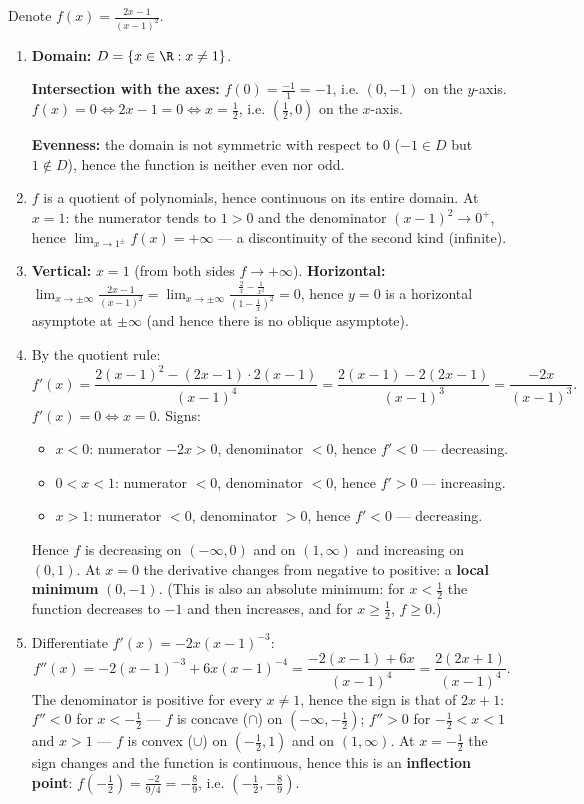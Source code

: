 \begin{solution}
Denote $f(x)=\frac{2x-1}{(x-1)^2}$.
\begin{enumerate}
  \item \textbf{Domain:} $D=\{x\in\R: x\neq1\}$.

  \textbf{Intersection with the axes:} $f(0)=\frac{-1}{1}=-1$, i.e. $(0,-1)$ on the $y$-axis. $f(x)=0\iff 2x-1=0\iff x=\frac12$, i.e. $(\frac12,0)$ on the $x$-axis.

  \textbf{Evenness:} the domain is not symmetric with respect to $0$ ($-1\in D$ but $1\notin D$), hence the function is neither even nor odd.

  \item $f$ is a quotient of polynomials, hence continuous on its entire domain. At $x=1$: the numerator tends to $1>0$ and the denominator $(x-1)^2\to0^+$, hence $\lim_{x\to1^\pm}f(x)=+\infty$ --- a discontinuity of the second kind (infinite).

  \item \textbf{Vertical:} $x=1$ (from both sides $f\to+\infty$).
  \textbf{Horizontal:} $\lim_{x\to\pm\infty}\frac{2x-1}{(x-1)^2}=\lim_{x\to\pm\infty}\frac{\frac2x-\frac1{x^2}}{(1-\frac1x)^2}=0$, hence $y=0$ is a horizontal asymptote at $\pm\infty$ (and hence there is no oblique asymptote).

  \item By the quotient rule:
  \[ f'(x)=\frac{2(x-1)^2-(2x-1)\cdot2(x-1)}{(x-1)^4}=\frac{2(x-1)-2(2x-1)}{(x-1)^3}=\frac{-2x}{(x-1)^3}. \]
  $f'(x)=0\iff x=0$. Signs:
  \begin{itemize}
    \item $x<0$: numerator $-2x>0$, denominator $<0$, hence $f'<0$ --- decreasing.
    \item $0<x<1$: numerator $<0$, denominator $<0$, hence $f'>0$ --- increasing.
    \item $x>1$: numerator $<0$, denominator $>0$, hence $f'<0$ --- decreasing.
  \end{itemize}
  Hence $f$ is decreasing on $(-\infty,0)$ and on $(1,\infty)$ and increasing on $(0,1)$. At $x=0$ the derivative changes from negative to positive: a \textbf{local minimum} $(0,-1)$. (This is also an absolute minimum: for $x<\frac12$ the function decreases to $-1$ and then increases, and for $x\ge\frac12$, $f\ge0$.)

  \item Differentiate $f'(x)=-2x(x-1)^{-3}$:
  \[ f''(x)=-2(x-1)^{-3}+6x(x-1)^{-4}=\frac{-2(x-1)+6x}{(x-1)^4}=\frac{2(2x+1)}{(x-1)^4}. \]
  The denominator is positive for every $x\neq1$, hence the sign is that of $2x+1$:
  $f''<0$ for $x<-\frac12$ --- $f$ is concave ($\cap$) on $(-\infty,-\frac12)$;
  $f''>0$ for $-\frac12<x<1$ and $x>1$ --- $f$ is convex ($\cup$) on $(-\frac12,1)$ and on $(1,\infty)$.
  At $x=-\frac12$ the sign changes and the function is continuous, hence this is an \textbf{inflection point}: $f(-\frac12)=\frac{-2}{9/4}=-\frac89$, i.e. $(-\frac12,-\frac89)$.


\end{enumerate}
\end{solution}
